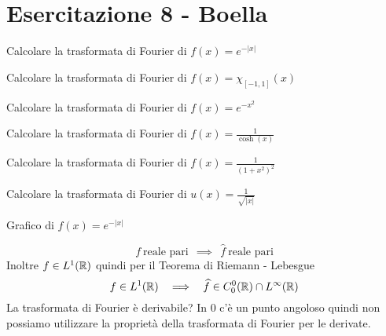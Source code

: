 \chapter{Esercitazione 8 - Boella}
\ParteEsercizi
\Esercizio{}

Calcolare la trasformata di Fourier di $f(x) = e^{- |x|}$
\Esercizio{}

Calcolare la trasformata di Fourier di $f(x) = \chi_{[ - 1, 1]} (x)$
\Esercizio{}

Calcolare la trasformata di Fourier di $f(x) = e^{- x^{2}}$
\Esercizio{}

Calcolare la trasformata di Fourier di $f(x) = \frac{1}{\cosh (x)}$
\Esercizio{}

Calcolare la trasformata di Fourier di $f(x) = \frac{1}{\left(1 + x^{2}\right)^{2}}$
\Esercizio{}

Calcolare la trasformata di Fourier di $u(x) = \frac{1}{\sqrt{|x|}}$

\ParteSoluzioni
\Soluzione

Grafico di $f(x) = e^{- | x|}$

\begin{equation*}
f\ \text{reale pari} \ \ \implies \ \ \hat{f} \ \text{reale pari}
\end{equation*}
Inoltre $f\in L^{1}(\mathbb{R})$ quindi per il Teorema di Riemann - Lebesgue
\begin{equation*}
f\in L^{1}(\mathbb{R}) \ \ \implies \ \ \widehat{f} \in C^{0}_{0}(\mathbb{R}) \cap L^{\infty}(\mathbb{R})
\end{equation*}
La trasformata di Fourier è derivabile? In $0$ c'è un punto angoloso quindi non possiamo utilizzare la proprietà della trasformata di Fourier per le derivate.

